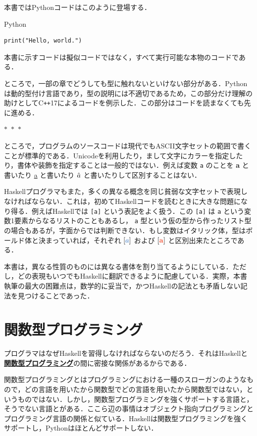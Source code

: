 \documentclass[a5paper,twoside,fleqn,draft]{jsbook}
\def\varColor{NavyBlue}
\def\typeColor{RedOrange}
\newcommand{\separator}{\begin{center}$*$~$*$~$*$\end{center}}
\newcommand{\programminglanguage}[1]{\textsf{#1}}
\newcommand{\cxx}{\programminglanguage{C}\texttt{++}}
\newcommand{\cxxseventeen}{\cxx\programminglanguage{17}}
\newcommand{\haskell}{\programminglanguage{Haskell}}
\newcommand{\python}{\programminglanguage{Python}}
\newcommand{\keyword}[1]{{\underline{\textbf{#1}}}}
\newcommand{\code}[1]{\texttt{#1}}
\newenvironment{pythoncode}{\begin{itembox}[r]{\python}}{\end{itembox}}
\newcommand{\mVar}[1]{\textcolor{\varColor}{#1}}
\newcommand{\mType}[1]{\textcolor{\typeColor}{\mathbf{#1}}}
\newcommand{\mA}{\mType{a}}
\begin{document}
本書では\python コードはこのように登場する．
\begin{pythoncode}
\begin{verbatim}
print("Hello, world.")
\end{verbatim}
\end{pythoncode}
本書に示すコードは擬似コードではなく，すべて実行可能な本物のコードである．

ところで，一部の章でどうしても型に触れないといけない部分がある．\python は動的型付け言語であり，型の説明には不適切であるため，この部分だけ理解の助けとして\cxxseventeen によるコードを例示した．この部分はコードを読まなくても先に進める．

\separator

ところで，プログラムのソースコードは現代でもASCII文字セットの範囲で書くことが標準的である．Unicodeを利用したり，まして文字にカラーを指定したり，書体や装飾を指定することは一般的ではない．例えば変数 \code{a} のことを \textbf{a} と書いたり \underline{a} と書いたり $\Hat a$ と書いたりして区別することはない．

\haskell プログラマもまた，多くの異なる概念を同じ貧弱な文字セットで表現しなければならない．これは，初めて\haskell コードを読むときに大きな問題になり得る．例えば\haskell では \code{[a]} という表記をよく扱う．この \code{[a]} は \code{a} という変数1要素からなるリストのこともあるし， \code{a} 型という仮の型から作ったリスト型の場合もあるが，字面からでは判断できない．もし変数はイタリック体，型はボールド体と決まっていれば，それぞれ $[\mVar{a}]$ および $[\mA]$ と区別出来たところである．

本書は，異なる性質のものには異なる書体を割り当てるようにしている．ただし，どの表現もいつでも\haskell に翻訳できるように配慮している．実際，本書執筆の最大の困難点は，数学的に妥当で，かつ\haskell の記法とも矛盾しない記法を見つけることであった．

\section{関数型プログラミング}

プログラマはなぜ\haskell を習得しなければならないのだろう．それは\haskell と\keyword{関数型プログラミング}の間に密接な関係があるからである．

関数型プログラミングとはプログラミングにおける一種のスローガンのようなもので，どの言語を用いたから関数型でどの言語を用いたから関数型ではない，というものではない．しかし，関数型プログラミングを強くサポートする言語と，そうでない言語とがある．ここら辺の事情はオブジェクト指向プログラミングとプログラミング言語の関係と似ている．\haskell は関数型プログラミングを強くサポートし，\python はほとんどサポートしない．
\end{document}
